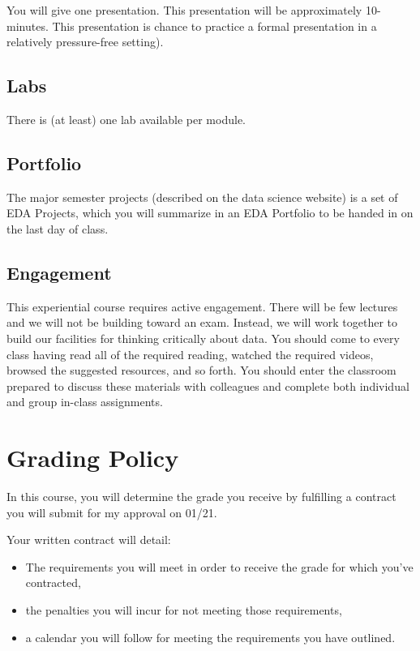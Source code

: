 You will give one presentation. This presentation will be approximately 10-minutes. This presentation is chance to practice a formal presentation in a relatively pressure-free setting).

\hypertarget{labs}{%
\subsection*{Labs}\label{labs}}


There is (at least) one lab available per module.

\hypertarget{portfolio}{%
\subsection*{Portfolio}\label{portfolio}}


The major semester projects (described on the data science website) is a set of EDA Projects, which you will summarize in an EDA Portfolio to be handed in on the last day of class.

\hypertarget{engagement}{%
\subsection*{Engagement}\label{engagement}}


This experiential course requires active engagement. There will be few lectures and we will not be building toward an exam. Instead, we will work together to build our facilities for thinking critically about data. You should come to every class having read all of the required reading, watched the required videos, browsed the suggested resources, and so forth. You should enter the classroom prepared to discuss these materials with colleagues and complete both individual and group in-class assignments.

\hypertarget{grading-policy-3}{%
\section*{Grading Policy}\label{grading-policy-3}}


In this course, you will determine the grade you receive by fulfilling a contract you will submit for my approval on 01/21.

Your written contract will detail:

\begin{itemize}
\item
  The requirements you will meet in order to receive the grade for which you've contracted,
\item
  the penalties you will incur for not meeting those requirements,
\item
  a calendar you will follow for meeting the requirements you have outlined.
\end{itemize}

